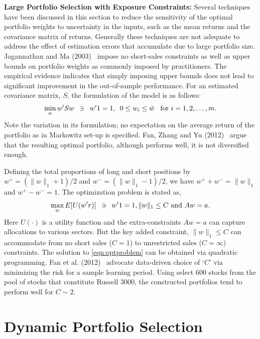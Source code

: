 \noindent\textbf{Large Portfolio Selection with Exposure Constraints:} Several techniques have been discussed in this section to reduce the sensitivity of the optimal portfolio weights to uncertainty in the inputs, such as the mean returns and the covariance matrix of returns. Generally these techniques are not adequate to address the effect of estimation errors that accumulate due to large portfolio size. Jagannathan and Ma (2003)~\cite{jagma} impose no short-sales constraints as well as upper bounds on portfolio weights as commonly imposed by practitioners. The empirical evidence indicates that simply imposing upper bounds does not lead to significant improvement in the out-of-sample performance. For an estimated covariance matrix, $S$, the formulation of the model is as follows:
	\begin{equation} \label{eqn:estcovmat}
	\min_w w'Sw \enskip \ni \enskip w'1=1, \enskip 0\leq w_i \leq \tilde{w} \enskip\text{ for }i= 1, 2, \ldots, m.
	\end{equation}
Note the variation in its formulation; no expectation on the average return of the portfolio as in Markowitz set-up is specified. Fan, Zhang and Yu (2012)~\cite{fanzhanyu} argue that the resulting optimal portfolio, although performs well, it is not diversified enough. 


Defining the total proportions of long and short positions by $w^+=(\|w\|_1+1)/2$ and $w^-= (\|w\|_1-1)/2$, we have $w^+ + w^-= \|w\|_1$ and $w^+ - w^- =1$. The optimization problem is stated as,
	\begin{equation} \label{eqn:optproblem}
	\max_w E[U(w'r)] \enskip \ni \enskip w'1=1, \|w\|_1 \leq C \text{ and } Aw=a.
	\end{equation}
Here $U(\cdot)$ is a utility function and the extra-constraints $Aw=a$ can capture allocations to various sectors. But the key added constraint, $\|w\|_1 \leq C$ can accommodate from no short sales ($C=1$) to unrestricted sales ($C= \infty$) constraints. The solution to \eqref{eqn:optproblem} can be obtained via quadratic programming. Fan et al. (2012)~\cite{fanzhanyu} advocate data-driven choice of `$C$' via minimizing the risk for a sample learning period. Using select 600 stocks from the pool of stocks that constitute Russell 3000, the constructed portfolios tend to perform well for $C \sim 2$. 



\section{Dynamic Portfolio Selection}


